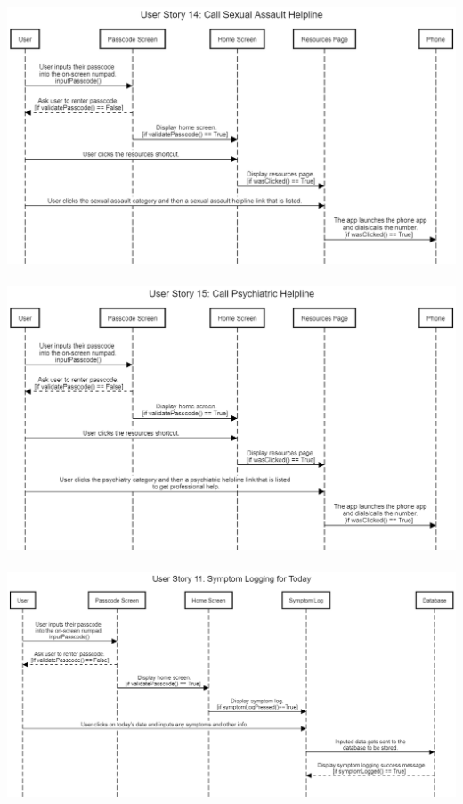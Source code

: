 \documentclass[letterpaper,12pt,titlepage]{article}
\begin{document}
\newline
\newline
\hspace*{-.5in}
\includegraphics[scale=.45]{User_Story_14__Call_Sexual_Assault_Helpline}~\cite{seqdia}
\newline
\newline
\hspace*{-.5in}
\includegraphics[scale=.45]{User_Story_15__Call_Psychiatric_Helpline}~\cite{seqdia}
\newline
\newline
\hspace*{-.5in}
\includegraphics[scale=.4]{User_Story_11__Symptom_Logging_for_Today}~\cite{seqdia}
\end{document}
